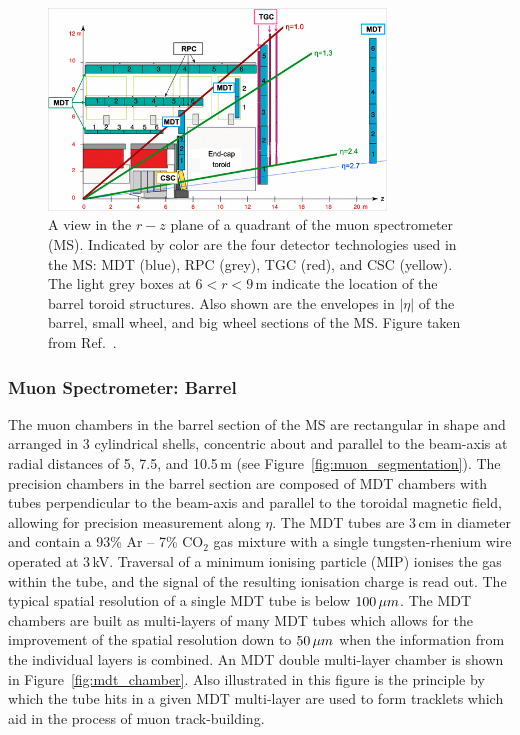 \begin{figure}[!htb]
    \begin{center}
        \includegraphics[width=0.8\textwidth]{figures/chapter2/muon_spec/atlas_muon_plan_view_eta}
        \caption{
            A view in the $r-z$ plane of a quadrant of the muon spectrometer (MS).
            Indicated by color are the four detector technologies used in the MS:
            MDT (blue), RPC (grey), TGC (red), and CSC (yellow).
            The light grey boxes at $6 < r < 9$\,m indicate the location of the
            barrel toroid structures.
            Also shown are the envelopes in $\lvert \eta \rvert$ of the barrel,
            small wheel, and big wheel sections of the MS.
            Figure taken from Ref.~\cite{MuonTrigPerf8}.
        }
        \label{fig:muon_plan_view_eta}
    \end{center}
\end{figure}
\FloatBarrier

\subsubsection{Muon Spectrometer: Barrel}
\label{sec:ms_barrel}

The muon chambers in the barrel section of the MS are rectangular in shape and arranged in 3 cylindrical shells,
concentric about and parallel to the beam-axis at radial distances of 5, 7.5, and 10.5\,m (see Figure~\ref{fig:muon_segmentation}).
The precision chambers in the barrel section are composed of MDT chambers
with tubes perpendicular to the beam-axis and parallel to the toroidal magnetic field,
allowing for precision measurement along $\eta$.
The MDT tubes are $3\,$cm in diameter and contain a 93\% Ar -- 7\% CO$_2$ gas mixture
with a single tungsten-rhenium wire operated at $3$\,kV.
Traversal of a minimum ionising particle (MIP) ionises the gas within the tube,
and the signal of the resulting ionisation charge is read out.
The typical spatial resolution of a single MDT tube is below $100\,\mu m$.
The MDT chambers are built as multi-layers of many MDT tubes which allows for the improvement
of the spatial resolution down to $50\,\mu m$ when the information from the individual layers is combined.
An MDT double multi-layer chamber is shown in Figure~\ref{fig:mdt_chamber}.
Also illustrated in this figure is the principle by which the tube hits in a given MDT
multi-layer are used to form tracklets which aid in the process of muon track-building.

